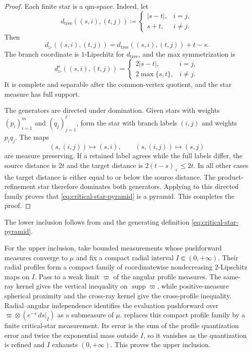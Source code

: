 \documentclass[10pt,a4paper]{amsart}
\numberwithin{equation}{section}
\DeclareMathOperator{\supp}{supp}
\begin{document}
\begin{proof}
Each finite star is a qm-space.  Indeed, let
\[
 d_{\mathrm{tree}}((s,i),(t,j))
 \coloneqq\begin{cases}|s-t|,&i=j,\\s+t,&i\ne j.
 \end{cases}
\]
Then
\begin{equation}\label{eq:star-tree-potential} d_{\rhd}((s,i),(t,j)) =d_{\mathrm{tree}}((s,i),(t,j))+t-s. \end{equation}
The branch coordinate is $1$-Lipschitz for $d_{\mathrm{tree}}$, and the max symmetrization is
\begin{equation}\label{eq:star-symmetrization}
 d_{\rhd}^{\mathrm s}((s,i),(t,j))
 =\begin{cases}
 2|s-t|,&i=j,\\
 2\max\{s,t\},&i\ne j.
 \end{cases}
\end{equation}
It is complete and separable after the common-vertex quotient, and the star measure has full support.

The generators are directed under domination.  Given stars with weights $(p_i)_{i=1}^m$ and $(q_j)_{j=1}^\ell$, form the star with branch labels $(i,j)$ and weights $p_iq_j$.  The maps
\[ (s,(i,j))\longmapsto(s,i), \qquad (s,(i,j))\longmapsto(s,j) \]
are measure preserving.  If a retained label agrees while the full labels differ, the source distance is $2t$ and the target distance is $2(t-s)_+\le2t$.  In all other cases the target distance is either equal to or below the source distance.  The product-refinement star therefore dominates both generators.  Applying  to this directed family proves that \eqref{eq:critical-star-pyramid} is a pyramid.  This completes the proof.
\end{proof}

The lower inclusion follows from  and the generating definition \eqref{eq:critical-star-pyramid}.

For the upper inclusion, take bounded measurements whose pushforward measures converge to $\mu$ and fix a compact radial interval $I\Subset(0,+\infty)$.  Their radial profiles form a compact family of coordinatewise nondecreasing $2$-Lipschitz maps on $I$.  Pass to a weak limit $\varpi$ of the angular profile measures.  The same-ray kernel gives the vertical inequality on $\supp\varpi$, while positive-measure spherical proximity and the cross-ray kernel give the cross-profile inequality.  Radial--angular independence identifies the evaluation pushforward over $\varpi\otimes(e^{-s}\,ds|_I)$ as a submeasure of $\mu$.   replaces this compact profile family by a finite critical-star measurement.  Its error is the sum of the profile quantization error and twice the exponential mass outside $I$, so it vanishes as the quantization is refined and $I$ exhausts $(0,+\infty)$.  This proves the upper inclusion.
\end{document}
